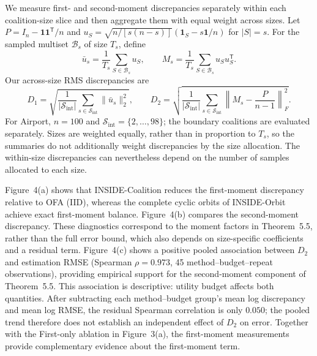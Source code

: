 We measure first- and second-moment discrepancies separately within each
coalition-size slice and then aggregate them with equal weight across sizes.
Let $P=I_n-\mathbf{1}\mathbf{1}^{\mathsf T}/n$ and
$u_S=\sqrt{n/[s(n-s)]}(\mathbf{1}_S-s\mathbf{1}/n)$ for $|S|=s$.
For the sampled multiset $\mathcal B_s$ of size $T_s$, define
\[
\bar u_s=\frac{1}{T_s}\sum_{S\in\mathcal B_s}u_S,
\qquad
M_s=\frac{1}{T_s}\sum_{S\in\mathcal B_s}u_Su_S^{\mathsf T}.
\]
Our across-size RMS discrepancies are
\[
D_1=\sqrt{\frac{1}{|\mathcal S_{\mathrm{int}}|}
\sum_{s\in\mathcal S_{\mathrm{int}}}\|\bar u_s\|_2^2},
\qquad
D_2=\sqrt{\frac{1}{|\mathcal S_{\mathrm{int}}|}
\sum_{s\in\mathcal S_{\mathrm{int}}}
\left\|M_s-\frac{P}{n-1}\right\|_F^2}.
\]
For Airport, $n=100$ and $\mathcal S_{\mathrm{int}}=\{2,\ldots,98\}$;
the boundary coalitions are evaluated separately. Sizes are weighted equally,
rather than in proportion to $T_s$, so the summaries do not additionally
weight discrepancies by the size allocation. The within-size discrepancies
can nevertheless depend on the number of samples allocated to each size.

Figure~4(a) shows that INSIDE-Coalition reduces the first-moment discrepancy
relative to OFA (IID), whereas the complete cyclic orbits of INSIDE-Orbit
achieve exact first-moment balance. Figure~4(b) compares the second-moment
discrepancy. These diagnostics correspond to the moment factors in
Theorem~5.5, rather than the full error bound, which also depends on
size-specific coefficients and a residual term.
Figure~4(c) shows a positive pooled association between $D_2$ and estimation
RMSE (Spearman $\rho=0.973$, 45 method--budget--repeat observations),
providing empirical support for the second-moment component of Theorem~5.5.
This association is descriptive: utility budget affects both quantities.
After subtracting each method--budget group's mean log discrepancy and mean
log RMSE, the residual Spearman correlation is only $0.050$; the pooled
trend therefore does not establish an independent effect of $D_2$ on error.
Together with the First-only ablation in Figure~3(a), the first-moment
measurements provide complementary evidence about the first-moment term.


